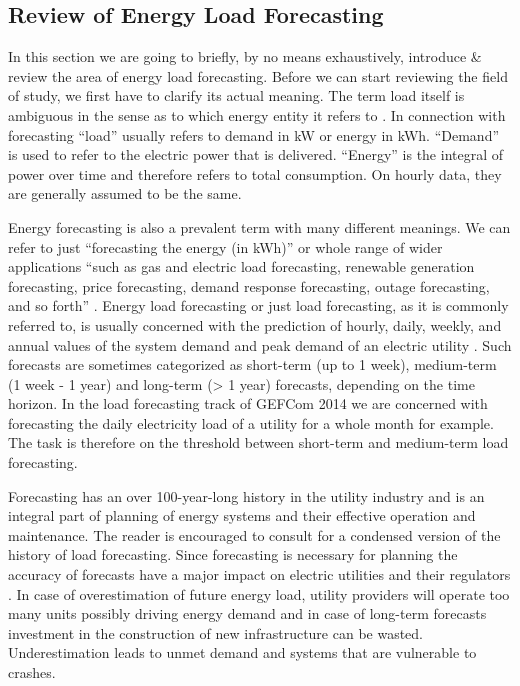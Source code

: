 \documentclass[conference]{IEEEtran}
\begin{document}
\subsection{Review of Energy Load Forecasting}
\label{sec:review}
In this section we are going to briefly, by no means exhaustively, introduce \& review the area of energy load forecasting. Before we can start reviewing the field of study, we first have to clarify its actual meaning. The term load itself is ambiguous in the sense as to which energy entity it refers to \cite{Hong}. In connection with forecasting ``load'' usually refers to demand in kW or energy in kWh. ``Demand'' is used to refer to the electric power that is delivered. ``Energy'' is the integral of power over time and therefore refers to total consumption. On hourly data, they are generally assumed to be the same.\par 
Energy forecasting is also a prevalent term with many different meanings. We can refer to just ``forecasting the energy (in kWh)'' or whole range of wider applications ``such as gas and electric load forecasting, renewable generation forecasting, price forecasting, demand response forecasting, outage forecasting, and so forth'' \cite{Hong}.
Energy load forecasting or just load forecasting, as it is commonly referred to, is usually concerned with the prediction of hourly, daily, weekly, and annual values of the system demand and peak demand of an electric utility \cite{FanHyndman2012}. Such forecasts are sometimes categorized as short-term (up to 1 week), medium-term (1 week - 1 year) and long-term (> 1 year) forecasts, depending on the time horizon. In the load forecasting track of GEFCom 2014 we are concerned with forecasting the daily electricity load of a utility for a whole month for example. The task is therefore on the threshold between short-term and medium-term load forecasting.\par
Forecasting has an over 100-year-long history in the utility industry and is an integral part of planning of energy systems and their effective operation and maintenance. The reader is encouraged to consult \cite{HongForesight} for a condensed version of the history of load forecasting. 
Since forecasting is necessary for planning the accuracy of forecasts have a major impact on electric utilities and their regulators \cite{FanHyndman2012}. In case of overestimation of future energy load, utility providers will operate too many units possibly driving energy demand and in case of long-term forecasts investment in the construction of new infrastructure can be wasted. Underestimation leads to unmet demand and systems that are vulnerable to crashes.\par
\end{document}
